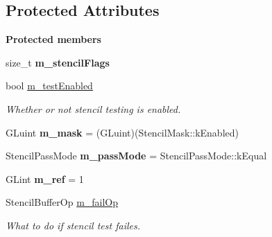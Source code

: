 \subsection*{Protected Attributes}
\begin{Indent}\textbf{ Protected members}\par
\begin{DoxyCompactItemize}
\item 
\mbox{\label{classrev_1_1_stencil_setting_a7af0304b475f50d253c037e741563899}} 
size\+\_\+t {\bfseries m\+\_\+stencil\+Flags}
\item 
\mbox{\label{classrev_1_1_stencil_setting_a0750876950025a47040bfc45b0e9eef4}} 
bool \mbox{\hyperlink{classrev_1_1_stencil_setting_a0750876950025a47040bfc45b0e9eef4}{m\+\_\+test\+Enabled}}
\begin{DoxyCompactList}\small\item\em Whether or not stencil testing is enabled. \end{DoxyCompactList}\item 
\mbox{\label{classrev_1_1_stencil_setting_a2714b46e46c9b729146cdd42fad777d6}} 
G\+Luint {\bfseries m\+\_\+mask} = (G\+Luint)(Stencil\+Mask\+::k\+Enabled)
\item 
\mbox{\label{classrev_1_1_stencil_setting_a72f107d07ae642af7c8d5b546f4d9729}} 
Stencil\+Pass\+Mode {\bfseries m\+\_\+pass\+Mode} = Stencil\+Pass\+Mode\+::k\+Equal
\item 
\mbox{\label{classrev_1_1_stencil_setting_ac20bc20a15835411e81fe4217b89a274}} 
G\+Lint {\bfseries m\+\_\+ref} = 1
\item 
\mbox{\label{classrev_1_1_stencil_setting_a78d531d3e2ba09a87e661b1bdfe59a0a}} 
Stencil\+Buffer\+Op \mbox{\hyperlink{classrev_1_1_stencil_setting_a78d531d3e2ba09a87e661b1bdfe59a0a}{m\+\_\+fail\+Op}}
\begin{DoxyCompactList}\small\item\em What to do if stencil test failes. \end{DoxyCompactList}\item 
\mbox{\label{classrev_1_1_stencil_setting_a68cac85a8e0011f8e9458c7bed7c4dd6}} 

\end{DoxyCompactItemize}
\end{Indent}
